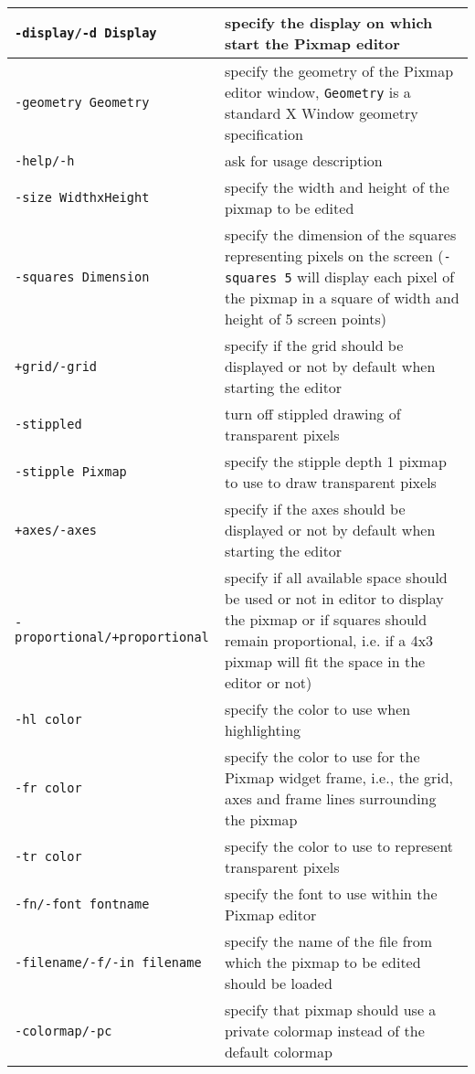 \begin{tabular}{|l|p{8cm}|}
\hline
{\tt -display/-d Display}   & specify the display on which start the
Pixmap editor\\\hline
{\tt -geometry Geometry} & specify the geometry of the Pixmap editor
window, {\tt Geometry} is a standard X Window geometry
specification\\\hline
{\tt -help/-h}           & ask for usage description\\\hline
{\tt -size WidthxHeight} & specify the width and height of the pixmap
to be edited\\\hline
{\tt -squares Dimension} & specify the dimension of the squares
representing pixels on the screen ({\tt -squares 5} will display 
each pixel of the pixmap in a square of width and height of 5 screen
points)\\\hline
{\tt +grid/-grid}        & specify if the grid should be displayed or not by
default when starting the editor\\\hline
{\tt -stippled}		 & turn off stippled drawing of transparent pixels\\\hline
{\tt -stipple Pixmap} 	 & specify the stipple depth 1 pixmap to use to draw
transparent pixels\\\hline
{\tt +axes/-axes}        & specify if the axes should be displayed or not by
default when starting the editor\\\hline
{\tt -proportional/+proportional} & specify if all available space
should be used or not in editor to display the pixmap or if squares
should remain proportional, i.e. if a 4x3 pixmap will fit the space in
the editor or not)\\\hline 
{\tt -hl color}          & specify the color to use when highlighting\\\hline
{\tt -fr color}          & specify the color to use for the Pixmap
widget frame, i.e., the grid, axes and frame lines surrounding the
pixmap\\\hline
{\tt -tr color} & specify the color to use to represent
transparent pixels\\\hline
{\tt -fn/-font fontname}     & specify the font to use within the Pixmap
editor\\\hline
{\tt -filename/-f/-in filename} & specify the name of the file from
which the pixmap to be edited should be loaded\\\hline
{\tt -colormap/-pc}	& specify that pixmap should use a private colormap
instead of the default colormap\\\hline
\end{tabular}\\

